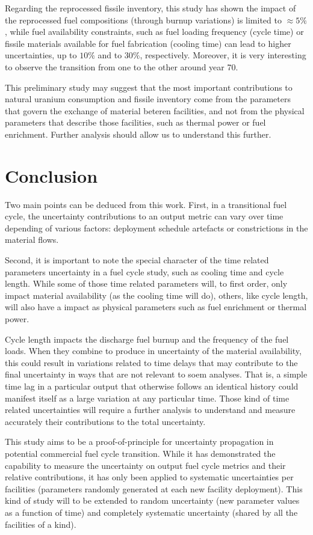 \documentclass{anstrans}
\begin{document}
Regarding the reprocessed fissile inventory, this study has shown the 
impact of the reprocessed fuel compositions (through burnup variations) is
limited to $\approx5\%$, while fuel availability constraints, such as fuel loading frequency (cycle
time) or fissile materials available for fuel fabrication (cooling time) can lead to higher
uncertainties, up to $10\%$ and to $30\%$, respectively.  Moreover, it is very
interesting to observe the transition from one to the other around
year 70.

This preliminary study may suggest that the most important contributions to
natural uranium consumption and fissile inventory come from the parameters that
govern the exchange of material beteren facilities, and not
from the physical parameters that describe those facilities, such as thermal power or fuel enrichment. Further
analysis should allow us to understand this further.

\section{Conclusion}

Two main points can be deduced from this work.  First, in a transitional
fuel cycle, the uncertainty contributions to an output metric can vary over time
depending of various factors: deployment schedule artefacts or constrictions in
the material flows.

Second, it is important to note the special character of the time related
parameters uncertainty in a fuel cycle study, such as cooling time and cycle
length.  While some of those time related parameters will, to first order, only
impact material availability (as the cooling time will do), others, like
cycle length, will also have a impact as physical parameters such as fuel
enrichment or thermal power.  

Cycle length impacts the discharge fuel burnup and  the frequency of
the fuel loads.  When they combine to produce in uncertainty of the
material availability, this could result in variations related to time delays that may
contribute to the final uncertainty in ways that are not relevant to soem analyses.
That is, a simple time lag in a particular output that otherwise follows an identical history
could manifest itself as a large variation at any particular time.
Those kind of time related uncertainties will require a further analysis
to understand and measure accurately their
contributions to the total uncertainty.

This study aims to be a proof-of-principle for uncertainty propagation in
potential commercial fuel cycle transition.  While it has demonstrated the
capability to measure the uncertainty on output fuel cycle metrics and their
relative contributions, it has only been applied to systematic uncertainties per
facilities (parameters randomly generated at each new facility deployment).
This kind of study will to be extended to random uncertainty (new parameter
values as a function of time) and completely systematic uncertainty (shared by all
the facilities of a kind).
\end{document}
